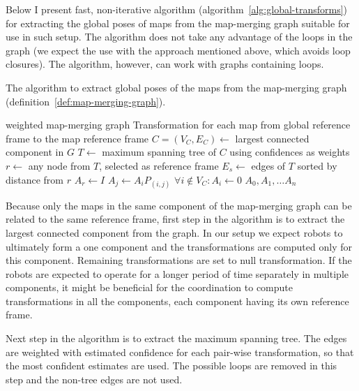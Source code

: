Below I present fast, non-iterative algorithm (algorithm~\ref{alg:global-transforms}) for extracting the global poses of maps from the map-merging graph suitable for use in such setup. The algorithm does not take any advantage of the loops in the graph (we expect the use with the approach mentioned above, which avoids loop closures). The algorithm, however, can work with graphs containing loops.

\begin{algorithm}
    \caption[Global poses extraction]{The algorithm to extract global poses of the maps from the map-merging graph (definition~\ref{def:map-merging-graph}).}
    \label{alg:global-transforms}
    \begin{algorithmic}[1]
        \Require weighted map-merging graph
        \Ensure Transformation for each map from global reference frame to the map reference frame
            \State $C = (V_C, E_C) \gets$ largest connected component in $G$
            \State $T \gets$ maximum spanning tree of $C$ using confidences as weights
            \State $r \gets$ any node from $T$, selected as reference frame
            \State $E_s \gets$ edges of $T$ sorted by distance from $r$
            \State $A_r \gets I$
                \State $A_j \gets A_i P_{(i,j)}$
            \EndFor
            \State $\forall i \not\in V_C: A_i \gets 0$
            \State \Return $A_0, A_1, \dots A_n$
        \EndFunction
    \end{algorithmic}
\end{algorithm}

Because only the maps in the same component of the map-merging graph can be related to the same reference frame, first step in the algorithm is to extract the largest connected component from the graph. In our setup we expect robots to ultimately form a one component and the transformations are computed only for this component. Remaining transformations are set to null transformation. If the robots are expected to operate for a longer period of time separately in multiple components, it might be beneficial for the coordination to compute transformations in all the components, each component having its own reference frame.

Next step in the algorithm is to extract the maximum spanning tree. The edges are weighted with estimated confidence for each pair-wise transformation, so that the most confident estimates are used. The possible loops are removed in this step and the non-tree edges are not used.

